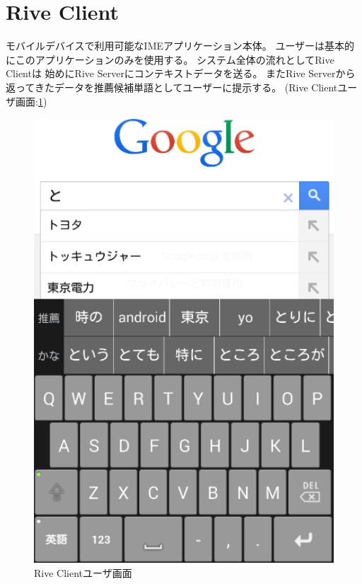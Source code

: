 \section{Rive Client}
モバイルデバイスで利用可能なIMEアプリケーション本体。
ユーザーは基本的にこのアプリケーションのみを使用する。
システム全体の流れとしてRive Clientは
始めにRive Serverにコンテキストデータを送る。
またRive Serverから返ってきたデータを推薦候補単語としてユーザーに提示する。
(Rive Clientユーザ画面:\ref{fig:riveclient})
\begin{figure}
  \begin{center}
    \includegraphics[width=140mm,bb=0 0 390 578]{images/riveclient.png}
  \end{center}
    \caption{Rive Clientユーザ画面}
    \label{fig:riveclient}
\end{figure}

